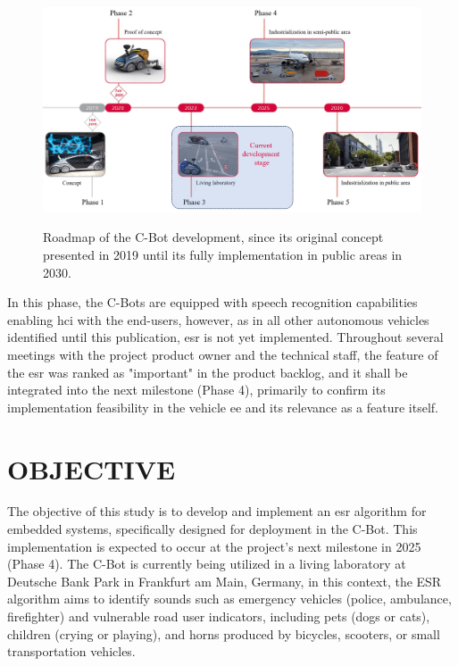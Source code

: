 \begin{figure}[htbp]
    \raggedright
        \caption{Roadmap of the C-Bot development, since its original concept presented in 2019 until its fully implementation in public areas in 2030.}
        \includegraphics[width=1\textwidth]{resources/images/020-introduction/Introduction_context_C-Bot_roadmap.png}
        \label{fig:introduction_C-Bot_roadmap}
\end{figure} 

In this phase, the C-Bots are equipped with speech recognition capabilities enabling \gls{hci} with the end-users, however, as in all other autonomous vehicles identified until this publication, \gls{esr} is not yet implemented. Throughout several meetings with the project product owner and the technical staff, the feature of the \gls{esr} was ranked as "important" in the product backlog, and it shall be integrated into the next milestone (Phase 4), primarily to confirm its implementation feasibility in the vehicle \gls{ee} and its relevance as a feature itself.


\section{OBJECTIVE}
\label{sec:introduction_objective}

The objective of this study is to develop and implement an \gls{esr}  algorithm for embedded systems, specifically designed for deployment in the C-Bot. This implementation is expected to occur at the project's next milestone in 2025 (Phase 4). The C-Bot is currently being utilized in a living laboratory at Deutsche Bank Park in Frankfurt am Main, Germany, in this context, the ESR algorithm aims to identify sounds such as emergency vehicles (police, ambulance, firefighter) and vulnerable road user indicators, including pets (dogs or cats), children (crying or playing), and horns produced by bicycles, scooters, or small transportation vehicles.

